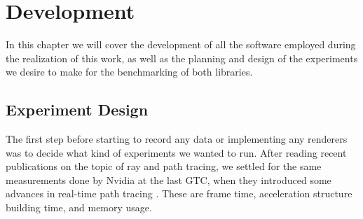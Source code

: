 \chapter{Development}
In this chapter we will cover the development of all the software employed during the realization of this work, as well as the planning and design of the experiments we desire to make for the benchmarking of both libraries.

\section{Experiment Design}
The first step before starting to record any data or implementing any renderers was to decide what kind of experiments we wanted to run. After reading recent publications on the topic of ray and path tracing, we settled for the same measurements done by Nvidia at the last GTC, when they introduced some advances in real-time path tracing \cite{Clarberg2022}. These are frame time, acceleration structure building time, and memory usage.

